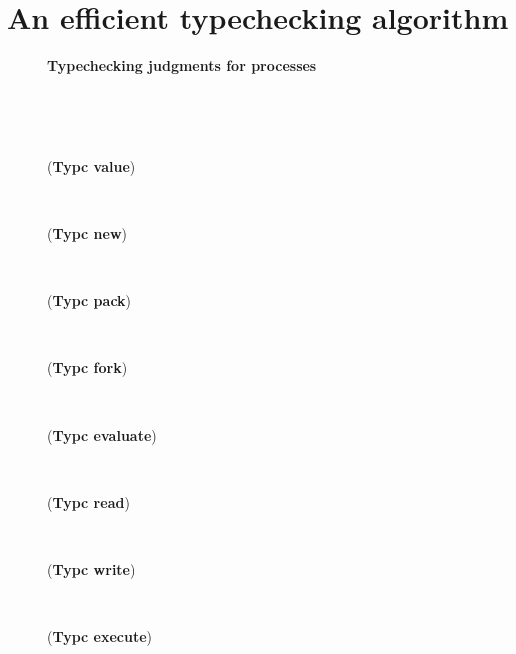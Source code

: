 \documentclass{sigplanconf}
\def\upbracketfill{}
\def\downbracketfill{}
\newcommand{\cenvvv}[3]{\vspace{0.8mm}
\begin{flushleft}
\parbox{8.4cm}{{\bf #1} }
\\
\parbox{8.4cm}{\downbracketfill}
\\
\vspace{-0.2cm}
\end{flushleft}
#3
\begin{flushleft}
\parbox{8.4cm}{\upbracketfill}
\end{flushleft}}
\newcommand{\labp}{\mathsf P}
\begin{document}
\section{An efficient typechecking algorithm}\label{algo}
\begin{figure}
\cenvvv{Typechecking judgments for processes}{\Gamma \vdash_{\labp} a : T \rhd \Gamma'}{
({\bf Typc value}) \vspace{-1mm}

~

({\bf Typc new}) \vspace{-1mm}

~

({\bf Typc pack}) \vspace{-1mm}

~

({\bf Typc fork}) \vspace{-1mm}

~

({\bf Typc evaluate}) \vspace{-1mm}

~

({\bf Typc read}) \vspace{-1mm}

~

({\bf Typc write}) \vspace{-1mm}

~

({\bf Typc execute}) \vspace{-1mm}

~

}
\end{figure}
\end{document}
